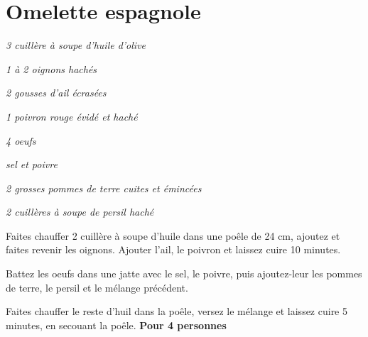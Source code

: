 \documentclass[10pt,a4paper]{recettes}
\begin{document}
    \maketitle

    \tableofcontents

    \section{Omelette espagnole}

    \begin{multicols}{2}
        \parbox[1cm]{\textwidth}{
            \begin{ingredients}
                \item \textit{3 cuillère à soupe d'huile d'olive}
                \item \textit{1 à 2 oignons hachés}
                \item \textit{2 gousses d'ail écrasées}
                \item \textit{1 poivron rouge évidé et haché}
                \item \textit{4 oeufs}
                \item \textit{sel et poivre}
                \item \textit{2 grosses pommes de terre cuites et émincées}
                \item \textit{2 cuillères à soupe de persil haché}
            \end{ingredients}
        }

        \columnbreak
        Faites chauffer 2 cuillère à soupe d'huile dans une poêle de 24 cm, ajoutez et faites revenir les oignons. Ajouter l'ail, le poivron et laissez cuire 10 minutes.
        \newline

        Battez les oeufs dans une jatte avec le sel, le poivre, puis ajoutez-leur les pommes de terre, le persil et le mélange précédent.
        \newline

        Faites chauffer le reste d'huil dans la poêle, versez le mélange et laissez cuire 5 minutes, en secouant la poêle.
        \newline
        \newline
        \textbf{Pour 4 personnes}
    \end{multicols}
\end{document}
